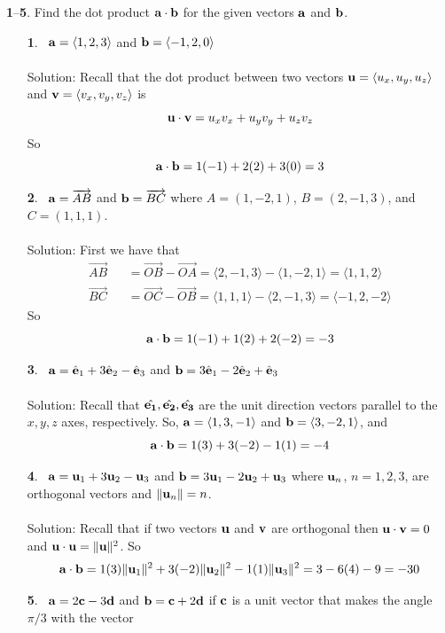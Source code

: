 \documentclass[12pt]{amsbook}
\newcommand{\la}{\langle}
\newcommand{\ra}{\rangle}
\begin{document}
\noindent
{\small\bf 1}--{\small\bf 5}. Find the dot product ${\bf a}\cdot{\bf b}$ for 
the given vectors ${\bf a}$ and ${\bf b}$.
\begin{enumerate}
\item[{\small\bf 1}.]\
${\bf a}=\la 1,2,3\ra$ and ${\bf b}= \la -1,2,0\ra$
\\
\\
{\sc Solution}:
Recall that the dot product between two vectors ${\bf u}=\la u_x,u_y,u_z \ra$ and ${\bf v}=\la v_x,v_y,v_z \ra$ is 
$$ {\bf u}\cdot{\bf v}=u_xv_x+u_yv_y+u_zv_z$$
So $$ {\bf a}\cdot{\bf b}=1(-1)+2(2)+3(0)=3$$
\item[{\small\bf 2}.]\ ${\bf a}=\overrightarrow{AB}$ and 
 ${\bf b}=\overrightarrow{BC}$ where $A=(1,-2,1)$, $B=(2,-1,3)$,
and $C=(1,1,1)$.
\\
\\
{\sc Solution}:
First we have that
\begin{eqnarray*}
\overrightarrow{AB}&&=\overrightarrow{OB}-\overrightarrow{OA}=\la 2,-1,3 \ra -\la 1,-2,1 \ra = \la 1,1,2 \ra \\
\overrightarrow{BC}&&=\overrightarrow{OC}-\overrightarrow{OB}=\la 1,1,1 \ra - \la 2,-1,3 \ra = \la -1,2,-2 \ra
\end{eqnarray*}
So
$$ {\bf a}\cdot{\bf b}=1(-1)+1(2)+2(-2)=-3$$
\item[{\small\bf 3}.]\ ${\bf
a}=\hat{\bf e}_1+ 3\hat{\bf e}_2- \hat{\bf e}_3$ and ${\bf
b}=3\hat{\bf e}_1- 2\hat{\bf e}_2+ \hat{\bf e}_3$
\\
\\
{\sc Solution}:
Recall that $\hat{\bf{e}_1},\hat{\bf{e}_2},\hat{\bf{e}_3}$ are the unit direction vectors parallel to the $x,y,z$ axes, respectively. So,
${\bf a}=\la 1,3,-1 \ra$ and ${\bf b}=\la 3,-2,1 \ra$, and 
$$ {\bf a}\cdot{\bf b}=1(3)+3(-2)-1(1)=-4$$
\item[{\small\bf 4}.]\ ${\bf
a}={\bf u}_1+ 3{\bf u}_2- {\bf u}_3$ and ${\bf
b}=3{\bf u}_1- 2{\bf u}_2+ {\bf u}_3$ where ${\bf u}_n$, $n=1,2,3$,
are orthogonal vectors and $\|{\bf u}_n\|=n$. 
\\
\\
{\sc Solution}:
Recall that if two vectors ${\bf u}$ and ${\bf v}$ are orthogonal then ${\bf u}\cdot{\bf v}=0$ and ${\bf u}\cdot{\bf u}=\|{\bf u}\|^2$. So
$$ {\bf a}\cdot{\bf b}=1(3)\|{\bf u}_1\|^2+3(-2)\|{\bf u}_2\|^2-1(1)\|{\bf u}_3\|^2=3-6(4)-9=-30$$
\item[{\small\bf 5}.]\ ${\bf a}=2{\bf c}-3{\bf d}$ and ${\bf b}=
{\bf c}+2{\bf d}$ if ${\bf c}$ is a unit vector
that makes the angle $\pi/3$ with the vector 

\end{enumerate}
\end{document}
